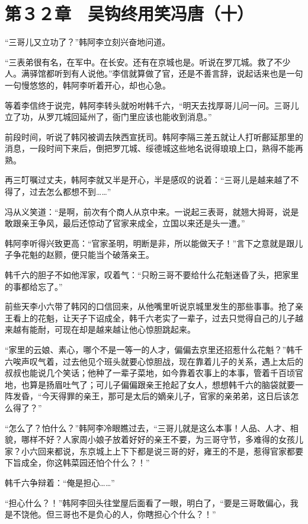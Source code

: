 \section{第３２章　吴钩终用笑冯唐（十）}

“三哥儿又立功了？”韩阿李立刻兴奋地问道。

“三表弟很有名，在军中。在长安。还有在京城也是。听说在罗兀城。救了不少人。满驿馆都听到有人说他。”李信就算做了官，还是不善言辞，说起话来也是一句一句慢悠悠的，韩阿李听着开心，却也心急。

等着李信终于说完，韩阿李转头就吩咐韩千六，“明天去找厚哥儿问一问。三哥儿立了功，从罗兀城回延州了，衙门里应该也能收到消息。”

前段时间，听说了韩冈被调去陕西宣抚司。韩阿李隔三差五就让人打听鄜延那里的消息，一段时间下来后，倒把罗兀城、绥德城这些地名说得琅琅上口，熟得不能再熟。

再三叮嘱过丈夫，韩阿李就又半是开心，半是感叹的说着：“三哥儿是越来越了不得了，过去怎么都想不到……”

冯从义笑道：“是啊，前次有个商人从京中来。一说起三表哥，就翘大拇哥，说是敢跟亲王争风，最后还惊动了官家来成全，立国以来还是头一遭。”

韩阿李听得兴致更高：“官家圣明，明断是非，所以能做天子！”言下之意就是跟儿子争花魁的赵颢，便只能当个破落亲王。

韩千六的胆子不如他浑家，叹着气：“只盼三哥不要给什么花魁迷昏了头，把家里的事都给忘了。”

前些天李小六带了韩冈的口信回来，从他嘴里听说京城里发生的那些事事。抢了亲王看上的花魁，让天子下诏成全，韩千六老实了一辈子，过去只觉得自己的儿子越来越有能耐，可现在却是越来越让他心惊胆跳起来。

“家里的云娘、素心，哪个不是一等一的人才，偏偏去京里还招惹什么花魁？”韩千六唉声叹气着，过去他见个班头就要心惊胆战，现在靠着儿子的关系，遇上太后的叔叔也能说几个笑话；他种了一辈子菜地，如今靠着农事上的本事，管着千百顷官地，也算是扬眉吐气了；可儿子偏偏跟亲王抢起了女人，想想韩千六的脑袋就要一阵发昏，“今天得罪的亲王，那可是太后的嫡亲儿子，官家的亲弟弟，这日后该怎么得了？”

“怎么了？怕什么？”韩阿李冷眼瞧过去，“三哥儿就是这么本事！人品、人才、相貌，哪样不好？人家周小娘子放着好好的亲王不要，为三哥守节，多难得的女孩儿家？小六回来都说，东京城上上下下都是说三哥的好，雍王的不是，惹得官家都要下旨成全，你这韩菜园还怕个什么？！”

韩千六争辩着：“俺是担心……”

“担心什么？！”韩阿李回头往堂屋后面看了一眼，明白了，“要是三哥敢偏心，我是不饶他。但三哥也不是负心的人，你瞎担心个什么？！”


